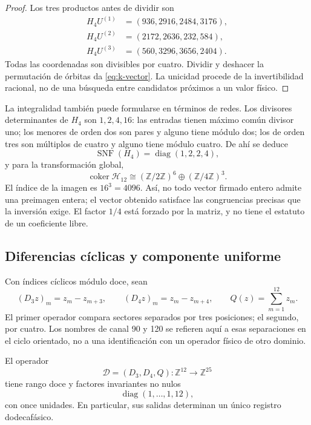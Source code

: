 \begin{proof}
Los tres productos antes de dividir son
\begin{align*}
 H_4U^{(1)}&=(936,2916,2484,3176),\\
 H_4U^{(2)}&=(2172,2636,232,584),\\
 H_4U^{(3)}&=(560,3296,3656,2404).
\end{align*}
Todas las coordenadas son divisibles por cuatro. Dividir y deshacer la
permutación de órbitas da \eqref{eq:k-vector}. La unicidad procede de la
invertibilidad racional, no de una búsqueda entre candidatos próximos a
un valor físico.
\end{proof}

La integralidad también puede formularse en términos de redes. Los
divisores determinantes de \(H_4\) son \(1,2,4,16\): las entradas
tienen máximo común divisor uno; los menores de orden dos son pares y
alguno tiene módulo dos; los de orden tres son múltiplos de cuatro y
alguno tiene módulo cuatro. De ahí se deduce
\[
 \operatorname{SNF}(H_4)=\operatorname{diag}(1,2,2,4),
\]
y para la transformación global,
\[
 \operatorname{coker}\mathcal H_{12}
 \cong(\mathbb Z/2\mathbb Z)^6\oplus(\mathbb Z/4\mathbb Z)^3.
\]
El índice de la imagen es \(16^3=4096\). Así, no todo vector firmado
entero admite una preimagen entera; el vector obtenido satisface las
congruencias precisas que la inversión exige. El factor \(1/4\) está
forzado por la matriz, y no tiene el estatuto de un coeficiente libre.

\subsection{Diferencias cíclicas y componente uniforme}
\label{subsec:k-transversal}

Con índices cíclicos módulo doce, sean
\[
 (D_3z)_m=z_m-z_{m+3},\qquad(D_4z)_m=z_m-z_{m+4},
 \qquad Q(z)=\sum_{m=1}^{12}z_m.
\]
El primer operador compara sectores separados por tres posiciones; el
segundo, por cuatro. Los nombres de canal 90 y 120 se refieren aquí a
esas separaciones en el ciclo orientado, no a una identificación con un
operador físico de otro dominio.

\begin{proposition}
\label{prop:k-transversal}
El operador
\[
 \mathcal D=(D_3,D_4,Q):\mathbb Z^{12}\longrightarrow\mathbb Z^{25}
\]
tiene rango doce y factores invariantes no nulos
\[
 \operatorname{diag}(1,\ldots,1,12),
\]
con once unidades. En particular, sus salidas determinan un único registro dodecafásico.
\end{proposition}

